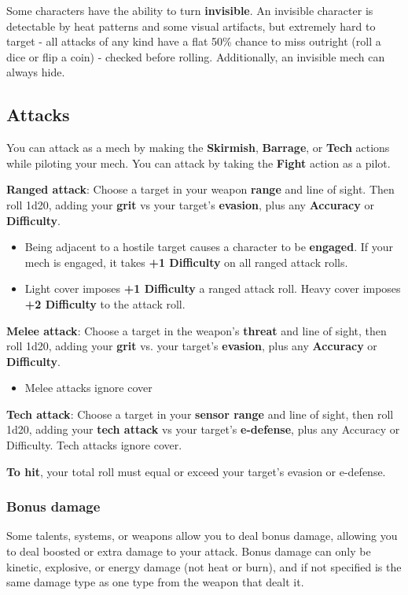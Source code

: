 Some characters have the ability to turn \textbf{invisible}. An invisible character is detectable by heat patterns and some visual artifacts, but extremely hard to target - all attacks of any kind have a flat 50\% chance to miss outright (roll a dice or flip a coin) - checked before rolling. Additionally, an invisible mech can always hide.


\subsection{Attacks}
You can attack as a mech by making the \textbf{Skirmish}, \textbf{Barrage}, or \textbf{Tech} actions while piloting your mech. You can attack by taking the \textbf{Fight} action as a pilot.

\textbf{Ranged attack}: Choose a target in your weapon \textbf{range} and line of sight. Then roll 1d20, adding your \textbf{grit} vs your target's \textbf{evasion}, plus any \textbf{Accuracy} or \textbf{Difficulty}.
\begin{itemize}
     \item Being adjacent to a hostile target causes a character to be \textbf{engaged}. If your mech is engaged, it takes \textbf{+1 Difficulty} on all ranged attack rolls.
     \item Light cover imposes \textbf{+1 Difficulty} a ranged attack roll. Heavy cover imposes \textbf{+2 Difficulty} to the attack roll.
\end{itemize}
\textbf{Melee attack}: Choose a target in the weapon's \textbf{threat} and line of sight, then roll 1d20, adding your \textbf{grit} vs. your target's \textbf{evasion}, plus any \textbf{Accuracy} or \textbf{Difficulty}.
\begin{itemize}
     \item Melee attacks ignore cover
\end{itemize}
\textbf{Tech attack}: Choose a target in your \textbf{sensor range} and line of sight, then roll 1d20, adding your \textbf{tech attack} vs your target's \textbf{e-defense}, plus any Accuracy or Difficulty. Tech attacks ignore cover.

\textbf{To hit}, your total roll must equal or exceed your target's evasion or e-defense.


\subsubsection{Bonus damage}
Some talents, systems, or weapons allow you to deal bonus damage, allowing you to deal boosted or extra damage to your attack. Bonus damage can only be kinetic, explosive, or energy damage (not heat or burn), and if not specified is the same damage type as one type from the weapon that dealt it.

